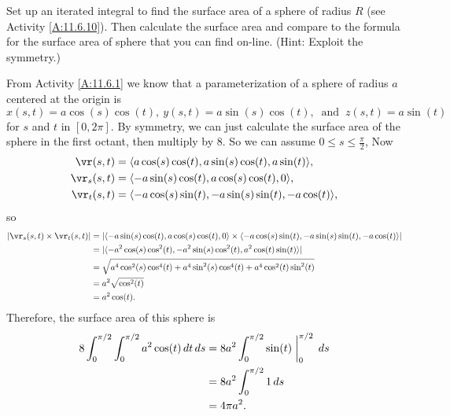 \begin{activity} \label{A:11.6.5} Set up an iterated integral to find the surface area of a sphere of radius $R$ (see Activity \ref{A:11.6.10}). Then calculate the surface area and compare to the formula for the surface area of sphere that you can find on-line. (Hint: Exploit the symmetry.)

\end{activity}
\begin{smallhint}

\end{smallhint}
\begin{bighint}

\end{bighint}
\begin{activitySolution}
From Activity \ref{A:11.6.1} we know that a parameterization of a sphere of radius $a$ centered at the origin is 
\[x(s,t) = a \cos(s) \cos(t), \ y(s,t) = a \sin(s) \cos(t), \ \text{ and } \ z(s,t) = a \sin(t)\]
for $s$ and $t$ in $[0, 2 \pi]$. By symmetry, we can just calculate the surface area of the sphere in the first octant, then multiply by 8. So we can assume $0 \leq s \leq \frac{\pi}{2}$, Now
\begin{align*}
\vr(s,t) &= \langle a\cos(s) \cos(t), a\sin(s)\cos(t), a\sin(t) \rangle, \\
\vr_s(s,t) &= \langle -a\sin(s) \cos(t), a\cos(s)\cos(t), 0 \rangle, \\
\vr_t(s,t) &= \langle -a\cos(s) \sin(t), -a\sin(s)\sin(t), -a\cos(t) \rangle,
\end{align*}
so
\begin{align*}
\lvert \vr_s(s,t) \times \vr_t(s,t) \rvert &= \lvert \langle -a\sin(s) \cos(t), a\cos(s)\cos(t), 0 \rangle \times \langle -a\cos(s) \sin(t), -a\sin(s)\sin(t), -a\cos(t) \rangle \rvert \\
    &= \lvert \langle -a^2\cos(s)\cos^2(t), -a^2\sin(s)\cos^2(t), a^2\cos(t)\sin(t) \rangle \rvert \\
    &= \sqrt{a^4\cos^2(s)\cos^4(t) + a^4\sin^2(s)\cos^4(t) + a^4\cos^2(t)\sin^2(t)} \\
    &= a^2\sqrt{\cos^2(t)} \\
    &= a^2\cos(t).
\end{align*}
Therefore, the surface area of this sphere is
\begin{align*}
8 \int_0^{\pi/2} \int_0^{\pi/2} a^2 \cos(t) \, dt \, ds &= 8a^2 \int_0^{\pi/2} \sin(t) \biggm|_0^{\pi/2} \, ds \\
    &= 8a^2 \int_0^{\pi/2} 1 \, ds \\
    &= 4\pi a^2.
\end{align*}

\end{activitySolution}
\aftera

